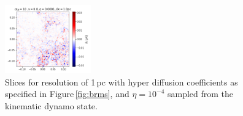 \documentclass[iop,apj,numberedappendix,twocolappendix]{emulateapj}
\begin{document}
\begin{figure}
\includegraphics[trim=0.0cm 0.00cm 0.0cm 0.0cm,clip=true,width=0.33\textwidth]{csc_figs/bb11pcPm0e-4_00.png}
\caption{
Slices for resolution of 1\,pc with hyper diffusion coefficients as 
specified in Figure\,\ref{fig:brms}, and $\eta=10^{-4}$ sampled from the 
kinematic dynamo state.
\label{fig:1pcUB}
}
\end{figure}

\end{document}
